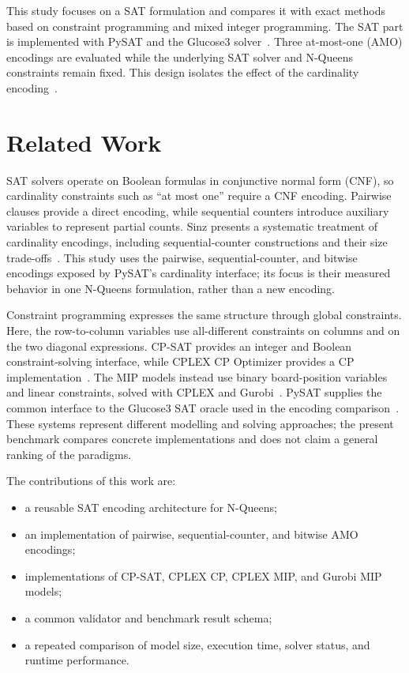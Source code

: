 \documentclass[a4paper,fleqn]{cas-sc}
\begin{document}
This study focuses on a SAT formulation and compares it with exact methods based on constraint programming and mixed integer programming. The SAT part is implemented with PySAT and the Glucose3 solver~\citep{ignatiev2018pysat}. Three at-most-one (AMO) encodings are evaluated while the underlying SAT solver and N-Queens constraints remain fixed. This design isolates the effect of the cardinality encoding~\citep{sinz2005cardinality}.

\section{Related Work}

SAT solvers operate on Boolean formulas in conjunctive normal form (CNF), so cardinality constraints such as ``at most one'' require a CNF encoding. Pairwise clauses provide a direct encoding, while sequential counters introduce auxiliary variables to represent partial counts. Sinz presents a systematic treatment of cardinality encodings, including sequential-counter constructions and their size trade-offs~\citep{sinz2005cardinality}. This study uses the pairwise, sequential-counter, and bitwise encodings exposed by PySAT's cardinality interface; its focus is their measured behavior in one N-Queens formulation, rather than a new encoding.

Constraint programming expresses the same structure through global constraints. Here, the row-to-column variables use all-different constraints on columns and on the two diagonal expressions. CP-SAT provides an integer and Boolean constraint-solving interface, while CPLEX CP Optimizer provides a CP implementation~\citep{ortools,cplex}. The MIP models instead use binary board-position variables and linear constraints, solved with CPLEX and Gurobi~\citep{cplex,gurobi}. PySAT supplies the common interface to the Glucose3 SAT oracle used in the encoding comparison~\citep{ignatiev2018pysat}. These systems represent different modelling and solving approaches; the present benchmark compares concrete implementations and does not claim a general ranking of the paradigms.

The contributions of this work are:
\begin{itemize}
    \item a reusable SAT encoding architecture for N-Queens;
    \item an implementation of pairwise, sequential-counter, and bitwise AMO encodings;
    \item implementations of CP-SAT, CPLEX CP, CPLEX MIP, and Gurobi MIP models;
    \item a common validator and benchmark result schema;
    \item a repeated comparison of model size, execution time, solver status, and runtime performance.
\end{itemize}
\end{document}
